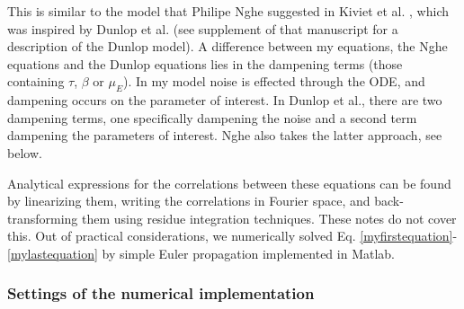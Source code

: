 This is similar to the model that Philipe Nghe suggested in Kiviet et al. \cite{Kiviet2014}, which was inspired by Dunlop et al. \cite{Dunlop2008} (see supplement of that manuscript for a description of the Dunlop model).
%
A difference between my equations, the Nghe equations and the Dunlop equations lies in the dampening terms (those containing $\tau$, $\beta$ or $\mu_E$). In my model noise is effected through the ODE, and dampening occurs on the parameter of interest. In Dunlop et al., there are two dampening terms, one specifically dampening the noise and a second term dampening the parameters of interest. Nghe also takes the latter approach, see below.

Analytical expressions for the correlations between these equations can be found by linearizing them, writing the correlations in Fourier space, and back-transforming them using residue integration techniques. 
These notes do not cover this. %
Out of practical considerations, we numerically solved Eq. \ref{myfirstequation}-\ref{mylastequation} by simple Euler propagation implemented in Matlab.

\subsubsection*{Settings of the numerical implementation}

